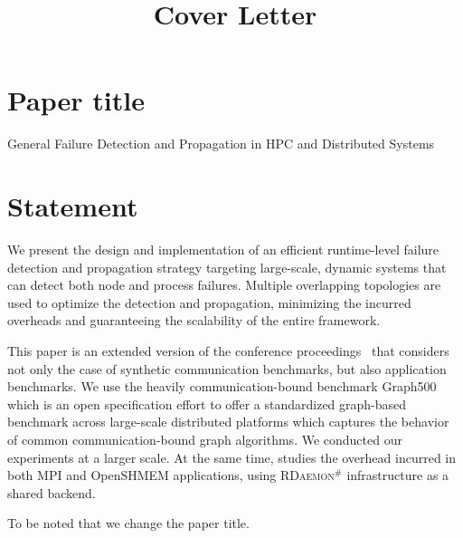 \documentclass[1p,times]{elsarticle}
\newcommand{\ourwork}[0]{\textsc{RDaemon}\ensuremath{^\#}\xspace}
\begin{document}
\title{Cover Letter}

\section*{Paper title}
General Failure Detection and Propagation in HPC and Distributed Systems

\section*{Statement}
We present the design and implementation of an efficient runtime-level failure detection and propagation strategy targeting large-scale, dynamic systems that can detect both node and process failures. Multiple overlapping topologies are used to optimize the detection and propagation, minimizing the incurred overheads and guaranteeing the scalability of the entire framework.


This paper is an extended version of the conference proceedings~\cite{Zhong:2019:RLF:3343211.3343225} that considers not only the case of synthetic communication benchmarks, but also application benchmarks.
We use the heavily communication-bound benchmark Graph500 which is an open specification effort to offer a standardized graph-based benchmark across large-scale distributed
platforms which captures the behavior of common communication-bound graph algorithms.
We conducted our experiments at a larger scale. At the same time, studies the overhead incurred in both MPI and OpenSHMEM applications, using \ourwork infrastructure as a shared backend.

To be noted that we change the paper title.



\end{document}
